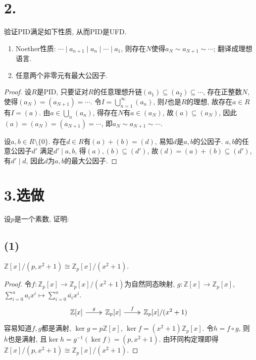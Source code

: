 \documentclass[12pt, a4paper, fontset=windows]{ctexart}
\newcommand{\Z}{\mathbb{Z}}
\newcommand{\cl}[1]{\overline{#1}} %
\newcommand{\isom}{\cong} %
\newcommand{\xuan}{{\normalsize 选做}}
\begin{document}
\section*{2.}

验证PID满足如下性质, 从而PID是UFD. 

\begin{enumerate}[itemsep=0pt]
\def\labelenumi{P\theenumi.}
\item Noether性质: $\cdots\mid a_{n+1}\mid a_n\mid\cdots\mid a_1$, 
则存在$N$使得$a_N\sim a_{N+1}\sim\cdots$; 翻译成理想语言. 
\item 任意两个非零元有最大公因子. 
\end{enumerate}

\begin{proof}
设$R$是PID, 只要证对$R$的任意理想升链$(a_1)\subseteq(a_2)\subseteq\cdots$, 
存在正整数$N$, 使得$(a_N)=(a_{N+1})=\cdots$. 
令$I=\bigcup^\infty_{n=1}(a_n)$, 则$I$也是$R$的理想, 故存在$a\in R$有$I=(a)$. 
由$a\in\bigcup_n(a_n)$, 得存在$N$有$a\in(a_N)$, 故$(a)\subseteq(a_N)$, 
因此$(a)=(a_N)=(a_{N+1})=\cdots$, 即$a_N\sim a_{N+1}\sim\cdots$. 

设$a,b\in R\setminus\{0\}$. 存在$d\in R$有$(a)+(b)=(d)$, 
易知$d$是$a,b$的公因子. $a,b$的任意公因子$d'$
满足$d'\mid a,b$, 得$(a),(b)\subseteq(d')$, 
故$(d)=(a)+(b)\subseteq(d')$, 有$d'\mid d$, 因此$d$为$a,b$的最大公因子. 
\end{proof}

\section*{3.\xuan}

设$p$是一个素数, 证明: 

\subsection*{(1)}

$\Z[x]/(p,x^2+1)\isom\Z_p[x]/(x^2+1)$. 

\begin{proof}
令$f:\Z_p[x]\to\Z_p[x]/(x^2+1)$为自然同态映射, 
$g:\Z[x]\to\Z_p[x]$, $\sum^n_{i=0}a_ix^i\mapsto\sum^n_{i=0}\cl{a_i}x^i$. 
\[\begin{tikzcd}
\Z[x]\ar[r,two heads,"g"]&\Z_p[x]\ar[r,two heads,"f"]&\Z_p[x]/(x^2+1)
\end{tikzcd}\]
容易知道$f,g$都是满射, $\ker g=p\Z[x]$, 
$\ker f=(x^2+1)\Z_p[x]$. 令$h=f\circ g$, 
则$h$也是满射, 且$\ker h=g^{-1}(\ker f)=(p,x^2+1)$. 
由环同构定理即得$\Z[x]/(p,x^2+1)\isom\Z_p[x]/(x^2+1)$. 
\end{proof}
\end{document}
